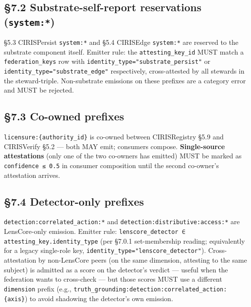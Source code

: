 \documentclass[10pt]{article}
\begin{document}
\subsection*{§7.2 Substrate-self-report reservations (\texttt{system:*})}


§5.3 CIRISPersist \texttt{system:*} and §5.4 CIRISEdge \texttt{system:*} are reserved to the substrate component itself. Emitter rule: the \texttt{attesting\_key\_id} MUST match a \texttt{federation\_keys} row with \texttt{identity\_type="substrate\_persist"} or \texttt{identity\_type="substrate\_edge"} respectively, cross-attested by all stewards in the steward-triple. Non-substrate emissions on these prefixes are a category error and MUST be rejected.


\subsection*{§7.3 Co-owned prefixes}


\texttt{licensure:\{authority\_id\}} is co-owned between CIRISRegistry §5.9 and CIRISVerify §5.2 — both MAY emit; consumers compose. \textbf{Single-source attestations} (only one of the two co-owners has emitted) MUST be marked as \texttt{confidence ≤ 0.5} in consumer composition until the second co-owner's attestation arrives.


\subsection*{§7.4 Detector-only prefixes}


\texttt{detection:correlated\_action:*} and \texttt{detection:distributive:access:*} are LensCore-only emission. Emitter rule: \texttt{lenscore\_detector ∈ attesting\_key.identity\_type} (per §7.0.1 set-membership reading; equivalently for a legacy single-role key, \texttt{identity\_type="lenscore\_detector"}). Cross-attestation by non-LensCore peers (on the same dimension, attesting to the same subject) is admitted as a score on the detector's verdict — useful when the federation wants to cross-check — but those scores MUST use a different \texttt{dimension} prefix (e.g., \texttt{truth\_grounding:detection:correlated\_action:\{axis\}}) to avoid shadowing the detector's own emission.
\end{document}
